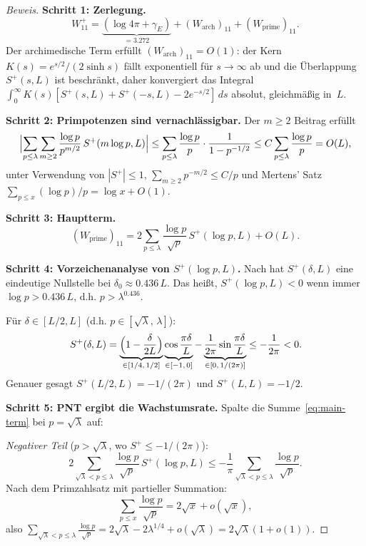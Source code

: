 ﻿\documentclass[12pt,a4paper]{article}
\theoremstyle{definition}
\theoremstyle{remark}
\begin{document}
\begin{proof}[Beweis]
\textbf{Schritt 1: Zerlegung.}
\[
  W_{11}^+ = \underbrace{(\log 4\pi + \gamma_E)}_{= 3.272} + (W_{\mathrm{arch}})_{11} + (W_{\mathrm{prime}})_{11}.
\]
Der archimedische Term erfüllt $(W_{\mathrm{arch}})_{11} = O(1)$: der Kern $K(s) = e^{s/2}/(2\sinh s)$ fällt exponentiell für $s \to \infty$ ab und die Überlappung $S^+(s, L)$ ist beschränkt, daher konvergiert das Integral $\int_0^{\infty} K(s)[S^+(s,L) + S^+(-s,L) - 2e^{-s/2}]\,ds$ absolut, gleichmäßig in~$L$.

\medskip\noindent\textbf{Schritt 2: Primpotenzen sind vernachlässigbar.}
Der $m \geq 2$ Beitrag erfüllt
\[
  \Bigl|\sum_{p \leq \lambda}\sum_{m \geq 2} \frac{\log p}{p^{m/2}}\,S^+(m\log p, L)\Bigr|
  \leq \sum_{p \leq \lambda} \frac{\log p}{p}\cdot\frac{1}{1 - p^{-1/2}}
  \leq C\sum_{p \leq \lambda}\frac{\log p}{p} = O(L),
\]
unter Verwendung von $|S^+| \leq 1$, $\sum_{m \geq 2} p^{-m/2} \leq C/p$ und Mertens' Satz $\sum_{p \leq x} (\log p)/p = \log x + O(1)$.

\medskip\noindent\textbf{Schritt 3: Hauptterm.}
\begin{equation}
\label{eq:main-term}
  (W_{\mathrm{prime}})_{11} = 2\sum_{p \leq \lambda}\frac{\log p}{\sqrt{p}}\,S^+(\log p, L) + O(L).
\end{equation}

\medskip\noindent\textbf{Schritt 4: Vorzeichenanalyse von $S^+(\log p, L)$.}
Nach  hat $S^+(\delta, L)$ eine eindeutige Nullstelle bei $\delta_0 \approx 0.436\,L$. Das heißt, $S^+(\log p, L) < 0$ wenn immer $\log p > 0.436\,L$, d.h. $p > \lambda^{0.436}$.

Für $\delta \in [L/2, L]$ (d.h. $p \in [\sqrt{\lambda},\,\lambda]$):
\[
  S^+(\delta, L) = \underbrace{\Bigl(1 - \frac{\delta}{2L}\Bigr)}_{\in [1/4,\,1/2]}
  \underbrace{\cos\frac{\pi\delta}{L}}_{\in [-1,\,0]}
  - \underbrace{\frac{1}{2\pi}\sin\frac{\pi\delta}{L}}_{\in [0,\,1/(2\pi)]}
  \leq -\frac{1}{2\pi} < 0.
\]
Genauer gesagt $S^+(L/2, L) = -1/(2\pi)$ und $S^+(L, L) = -1/2$.

\medskip\noindent\textbf{Schritt 5: PNT ergibt die Wachstumsrate.}
Spalte die Summe~\eqref{eq:main-term} bei $p = \sqrt{\lambda}$ auf:

\emph{Negativer Teil} ($p > \sqrt{\lambda}$, wo $S^+ \leq -1/(2\pi)$):
\[
  2\sum_{\sqrt{\lambda} < p \leq \lambda}\frac{\log p}{\sqrt{p}}\,S^+(\log p, L)
  \leq -\frac{1}{\pi}\sum_{\sqrt{\lambda} < p \leq \lambda}\frac{\log p}{\sqrt{p}}.
\]
Nach dem Primzahlsatz mit partieller Summation:
\[
  \sum_{p \leq x}\frac{\log p}{\sqrt{p}} = 2\sqrt{x} + o(\sqrt{x}),
\]
also $\displaystyle\sum_{\sqrt{\lambda} < p \leq \lambda}\frac{\log p}{\sqrt{p}} = 2\sqrt{\lambda} - 2\lambda^{1/4} + o(\sqrt{\lambda}) = 2\sqrt{\lambda}(1 + o(1))$.


\end{proof}
\end{document}
